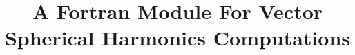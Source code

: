 \documentclass[times]{aastex631}
\begin{document}


\title{A Fortran Module For Vector Spherical Harmonics Computations}


\end{document}

